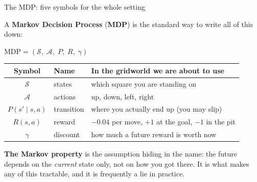 \documentclass[aspectratio=169]{beamer}
\begin{document}
\begin{frame}{The MDP: five symbols for the whole setting}
  \begin{center}
    \small A \textbf{Markov Decision Process} (\textbf{MDP}) is the standard way to write all of
    this down:

    \vskip 4pt
    {\large $\text{MDP} = (\mathcal{S},\; \mathcal{A},\; P,\; R,\; \gamma)$}
  \end{center}

  \vskip 8pt
  \begin{center}
  \small
  \begin{tabular}{c l l}
    \toprule
    \textbf{Symbol} & \textbf{Name} & \textbf{In the gridworld we are about to use} \\
    \midrule
    $\mathcal{S}$ & states & which square you are standing on \\
    $\mathcal{A}$ & actions & up, down, left, right \\
    $P(s'\mid s,a)$ & transition & where you actually end up (you may slip) \\
    $R(s,a)$ & reward & $-0.04$ per move, $+1$ at the goal, $-1$ in the pit \\
    $\gamma$ & discount & how much a future reward is worth now \\
    \bottomrule
  \end{tabular}
  \end{center}

  \vskip 10pt
  \begin{tcolorbox}[colback=armblue!8, colframe=armblue, boxrule=0.6pt, arc=2pt]
    \small
    \textbf{The Markov property} is the assumption hiding in the name: the future depends on
    the \emph{current} state only, not on how you got there. It is what makes any of this
    tractable, and it is frequently a lie in practice.
  \end{tcolorbox}
\end{frame}
\end{document}
